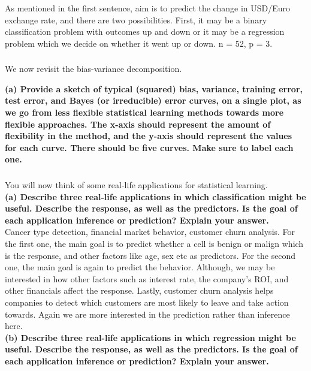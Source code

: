 \documentclass{article}
\begin{document}
As mentioned in the first sentence, aim is to predict the change in USD/Euro exchange rate, and there are two possibilities. First, it may be a binary classification problem with outcomes up and down or it may be a regression problem which we decide on whether it went up or down.
n = 52, p = 3.

\subsubsection{} We now revisit the bias-variance decomposition.

\textbf{(a) Provide a sketch of typical (squared) bias, variance, training error,
test error, and Bayes (or irreducible) error curves, on a single plot, as we go from less flexible statistical learning methods towards more flexible approaches. The x-axis should represent the amount of flexibility in the method, and the y-axis should represent the values for each curve. There should be five curves. Make sure to label each one.}

\subsubsection{} You will now think of some real-life applications for statistical learning. \\

\textbf{(a) Describe three real-life applications in which classification might
be useful. Describe the response, as well as the predictors. Is the goal of each application inference or prediction? Explain your answer. }\\

Cancer type detection, financial market behavior, customer churn analysis. For the first one, the main goal is to predict whether a cell is benign or malign which is the response, and other factors like age, sex etc as predictors.
For the second one, the main goal is again to predict the behavior. Although, we may be interested in how other factors such as interest rate, the company's ROI, and other financials affect the response.
Lastly, customer churn analysis helps companies to detect which customers are most likely to leave and take action towards. Again we are more interested in the prediction rather than inference here.\\

\textbf{(b) Describe three real-life applications in which regression might
be useful. Describe the response, as well as the predictors. Is the  goal of each application inference or prediction? Explain your answer.}\\
\end{document}
